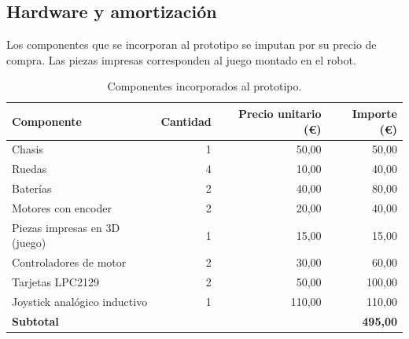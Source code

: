 \begin{samepage}
  \subsection{Hardware y amortización}
  \label{sec:presupuesto-hardware}

  Los componentes que se incorporan al prototipo se imputan por su precio
  de compra. Las piezas impresas corresponden al juego montado en el robot.

  \nopagebreak
  \begin{table}[H]
    \caption{Componentes incorporados al prototipo.}
    \label{tab:recursos_hardware}
    \begin{tabularx}{\linewidth}{@{}>{\raggedright\arraybackslash}X r r r@{}}
      \hline
      \textbf{Componente}           & \textbf{Cantidad} & \textbf{Precio unitario (€)} & \textbf{Importe (€)} \\
      \hline
      Chasis                        &                 1 &                        50,00 &                50,00 \\
      Ruedas                        &                 4 &                        10,00 &                40,00 \\
      Baterías                      &                 2 &                        40,00 &                80,00 \\
      Motores con encoder           &                 2 &                        20,00 &                40,00 \\
      Piezas impresas en 3D (juego) &                 1 &                        15,00 &                15,00 \\
      Controladores de motor        &                 2 &                        30,00 &                60,00 \\
      Tarjetas LPC2129              &                 2 &                        50,00 &               100,00 \\
      Joystick analógico inductivo  &                 1 &                       110,00 &               110,00 \\
      \hline
      \textbf{Subtotal}             &                   &                              &      \textbf{495,00} \\
      \hline
    \end{tabularx}
  \end{table}
\end{samepage}
\pagebreak[0]

